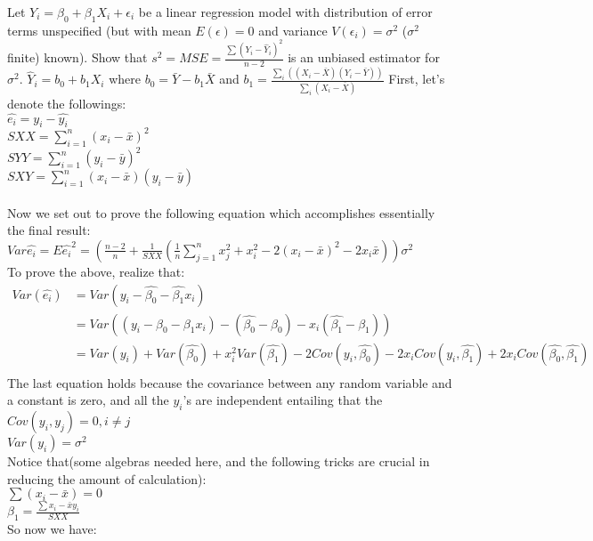 \documentclass[12pt]{article}
\begin{document}
 { Let $Y_i = \beta_0 + \beta_1 X_i + \epsilon_i$ be a
linear regression model with distribution of error terms unspecified
(but with mean $E(\epsilon) = 0$ and variance $V(\epsilon_i) =
\sigma^2$ ($\sigma^2$ finite) known).  Show that $s^2 = MSE =
\frac{\sum(Y_i-\hat Y_i)^2}{n-2}$ is an unbiased estimator for
$\sigma^2$.  $\hat Y_i = b_0 + b_1 X_i$ where $b_0 = \bar Y - b_1
\bar X$ and $b_1 = \frac{\sum_i((X_i-\bar X)(Y_i - \bar
Y))}{\sum_i(X_i-\bar X)}$ } { \vfill
  \answer
}
{
First, let's denote the followings:\\
$\hat{e_i}=y_i-\hat{y_i}$\\
$SXX=\displaystyle\sum_{i=1}^n (x_i-\bar{x})^2$\\
$SYY=\displaystyle\sum_{i=1}^n (y_i-\bar{y})^2$\\
$SXY=\displaystyle\sum_{i=1}^n (x_i-\bar{x})(y_i-\bar{y})$\\
\\
Now we set out to prove the following equation which accomplishes
essentially the final result:\\
$Var\hat{e_i}=E\hat{e_i}^2=(\frac{n-2}{n}+\frac{1}{SXX}(\frac{1}{n}\displaystyle\sum_{j=1}^nx_j^2+x_i^2-2(x_i-\bar{x})^2-2x_i\bar{x}))\sigma^2$\\
To prove the above, realize that:\\
\begin{align*}
Var(\hat{e_i})&=Var(y_i-\hat{\beta_0}-\hat{\beta_1}x_i)\\
              &=Var((y_i-\beta_0-\beta_1x_i)-(\hat{\beta_0}-\beta_0)-x_i(\hat{\beta_1}-\beta_1))\\
              &=Var(y_i)+Var(\hat{\beta_0})+x_i^2Var(\hat{\beta_1})-2Cov(y_i,\hat{\beta_0})-2x_iCov(y_i,\hat{\beta_1})+2x_iCov(\hat{\beta_0},\hat{\beta_1})\\
\end{align*}
The last equation holds because the covariance between any random
variable and a constant is zero, and all the $y_i$'s are independent
entailing that the $Cov(y_i,y_j)=0,i\not=j$\\
$Var(y_i)=\sigma^2$\\
Notice that(some algebras needed here, and the following tricks are
crucial in reducing the amount of calculation):\\
$\sum{(x_i-\bar{x})}=0$\\
$\beta_1=\frac{\sum{x_i-\bar{x}}y_i}{SXX}$\\
So now we have:\\
\begin{align*}

\end{align*}}
\end{document}
